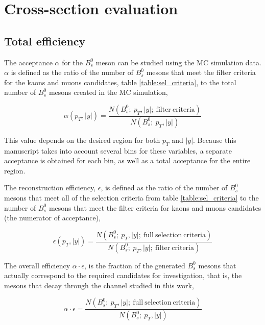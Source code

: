 \chapter[\leavevmode\newline Cross-section evaluation]{Cross-section evaluation}
\label{chap:Chapter_5}

\section{Total efficiency}

The acceptance $\alpha$ for the $B^0_s$ meson can be studied using the MC simulation data. $\alpha$ is defined as the ratio of the number of $B^0_s$ mesons that meet the filter criteria for the kaons and muons candidates, table \ref{table:sel_criteria}, to the total number of $B^0_s$ mesons created in the MC simulation,

\begin{equation}
\alpha(p_T, |y|) = \frac{N(B^0_s; \ p_T, |y| ; \ \mathrm{filter \ criteria})}{N(B^0_s; \ p_T, |y| )}
\end{equation}

This value depends on the desired region for both $p_T$ and $|y|$. Because this manuscript takes into account several bins for these variables, a separate acceptance is obtained for each bin, as well as a total acceptance for the entire region. 

The reconstruction efficiency, $\epsilon$, is defined as the ratio of the number of $B^0_s$ mesons that meet all of the selection criteria from table \ref{table:sel_criteria} to the number of $B^0_s$ mesons that meet the filter criteria for kaons and muons candidates (the numerator of acceptance),

\begin{equation}
	\epsilon(p_T, |y|) = \frac{N(B^0_s; \ p_T, |y| ; \ \mathrm{full \ selection \ criteria})}{N(B^0_s; \ p_T, |y| ; \ \mathrm{filter \ criteria})}
\end{equation}

The overall efficiency $\alpha \cdot \epsilon$, is the fraction of the generated $B^0_s$ mesons that actually correspond to the required candidates for investigation, that is, the mesons that decay through the channel studied in this work,

\begin{equation}
	\alpha \cdot \epsilon = \frac{N(B^0_s; \ p_T, |y| ; \ \mathrm{full \ selection \ criteria})}{N(B^0_s; \ p_T, |y|)}
\end{equation}


